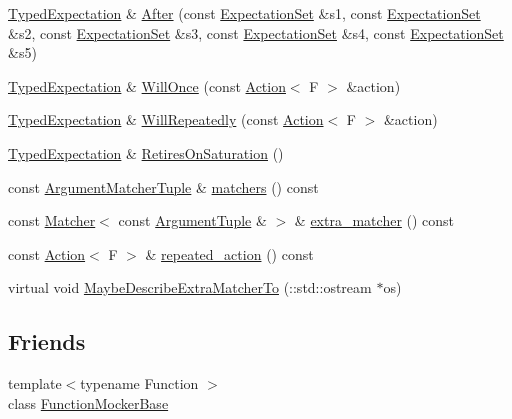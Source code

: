 \begin{DoxyCompactItemize}
\item 
\hyperlink{classtesting_1_1internal_1_1TypedExpectation}{Typed\+Expectation} \& \hyperlink{classtesting_1_1internal_1_1TypedExpectation_a72c0105b147ee2995d183c8e4109f6ca}{After} (const \hyperlink{classtesting_1_1ExpectationSet}{Expectation\+Set} \&s1, const \hyperlink{classtesting_1_1ExpectationSet}{Expectation\+Set} \&s2, const \hyperlink{classtesting_1_1ExpectationSet}{Expectation\+Set} \&s3, const \hyperlink{classtesting_1_1ExpectationSet}{Expectation\+Set} \&s4, const \hyperlink{classtesting_1_1ExpectationSet}{Expectation\+Set} \&s5)
\item 
\hyperlink{classtesting_1_1internal_1_1TypedExpectation}{Typed\+Expectation} \& \hyperlink{classtesting_1_1internal_1_1TypedExpectation_a41b0d15e44e95d52f4d5c310fb9e9683}{Will\+Once} (const \hyperlink{classtesting_1_1Action}{Action}$<$ F $>$ \&action)
\item 
\hyperlink{classtesting_1_1internal_1_1TypedExpectation}{Typed\+Expectation} \& \hyperlink{classtesting_1_1internal_1_1TypedExpectation_a73586c1adb458c5c431df9679e46f5f1}{Will\+Repeatedly} (const \hyperlink{classtesting_1_1Action}{Action}$<$ F $>$ \&action)
\item 
\hyperlink{classtesting_1_1internal_1_1TypedExpectation}{Typed\+Expectation} \& \hyperlink{classtesting_1_1internal_1_1TypedExpectation_ae7c42958a5d2c336ba7a42a871bf7709}{Retires\+On\+Saturation} ()
\item 
const \hyperlink{classtesting_1_1internal_1_1TypedExpectation_a8f10e3906761cc5c10fa3561c6e8938e}{Argument\+Matcher\+Tuple} \& \hyperlink{classtesting_1_1internal_1_1TypedExpectation_ac5c36609fee376f13bd9cfb2a9b41c9e}{matchers} () const 
\item 
const \hyperlink{classtesting_1_1Matcher}{Matcher}$<$ const \hyperlink{classtesting_1_1internal_1_1TypedExpectation_a9a91379262d101f435809ba4556d14fa}{Argument\+Tuple} \& $>$ \& \hyperlink{classtesting_1_1internal_1_1TypedExpectation_a6a46d9c67fd38c367ce0a0d63e65e523}{extra\+\_\+matcher} () const 
\item 
const \hyperlink{classtesting_1_1Action}{Action}$<$ F $>$ \& \hyperlink{classtesting_1_1internal_1_1TypedExpectation_a3af1ffccd9d897297fb19762b1551dec}{repeated\+\_\+action} () const 
\item 
virtual void \hyperlink{classtesting_1_1internal_1_1TypedExpectation_ab019251041a408dc5a5d8ae216be53f4}{Maybe\+Describe\+Extra\+Matcher\+To} (\+::std\+::ostream $\ast$os)
\end{DoxyCompactItemize}
\subsection*{Friends}
\begin{DoxyCompactItemize}
\item 
{\footnotesize template$<$typename Function $>$ }\\class \hyperlink{classtesting_1_1internal_1_1TypedExpectation_a1771ea4a3d92d8b2ff0f0aa6fc40ff55}{Function\+Mocker\+Base}
\end{DoxyCompactItemize}
